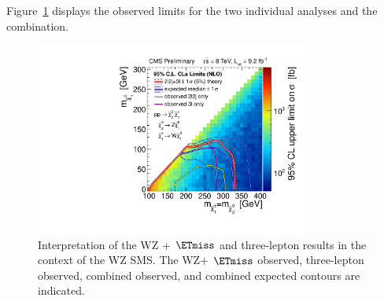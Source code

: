 Figure~\ref{fig:WZetmiss} displays the observed limits for the
two individual analyses and the combination.  

\begin{figure}[htp]
\begin{center}
\includegraphics[width=0.8\textwidth]{plots/exclusions/exclusion_TChiWZ.pdf}
\caption{Interpretation of the WZ + $\ETmiss$ and three-lepton results in the context of the WZ 
SMS. The WZ+ $\ETmiss$ observed, three-lepton observed, combined observed, and combined
expected contours are indicated.}
\label{fig:WZetmiss}
\end{center}
\end{figure}




